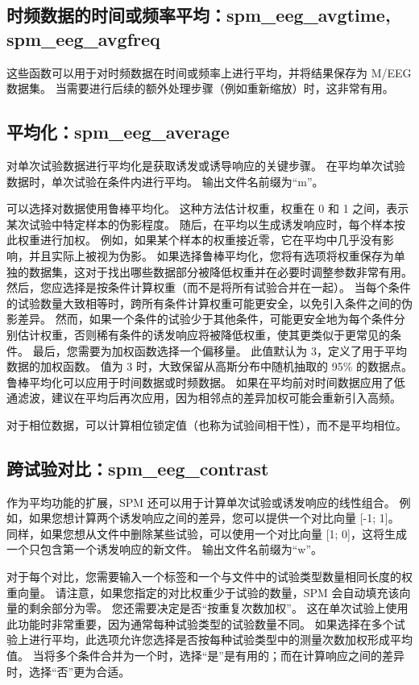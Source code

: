 \subsection{时频数据的时间或频率平均：spm\_eeg\_avgtime, spm\_eeg\_avgfreq}

这些函数可以用于对时频数据在时间或频率上进行平均，并将结果保存为 M/EEG 数据集。
当需要进行后续的额外处理步骤（例如重新缩放）时，这非常有用。


\subsection{平均化：spm\_eeg\_average}

对单次试验数据进行平均化是获取诱发或诱导响应的关键步骤。
在平均单次试验数据时，单次试验在条件内进行平均。
输出文件名前缀为“m”。

可以选择对数据使用鲁棒平均化。
这种方法估计权重，权重在 0 和 1 之间，表示某次试验中特定样本的伪影程度。
随后，在平均以生成诱发响应时，每个样本按此权重进行加权。
例如，如果某个样本的权重接近零，它在平均中几乎没有影响，并且实际上被视为伪影。
如果选择鲁棒平均化，您将有选项将权重保存为单独的数据集，这对于找出哪些数据部分被降低权重并在必要时调整参数非常有用。
然后，您应选择是按条件计算权重（而不是将所有试验合并在一起）。
当每个条件的试验数量大致相等时，跨所有条件计算权重可能更安全，以免引入条件之间的伪影差异。
然而，如果一个条件的试验少于其他条件，可能更安全地为每个条件分别估计权重，否则稀有条件的诱发响应将被降低权重，使其更类似于更常见的条件。
最后，您需要为加权函数选择一个偏移量。
此值默认为 3，定义了用于平均数据的加权函数。
值为 3 时，大致保留从高斯分布中随机抽取的 95\% 的数据点。
鲁棒平均化可以应用于时间数据或时频数据。
如果在平均前对时间数据应用了低通滤波，建议在平均后再次应用，因为相邻点的差异加权可能会重新引入高频。

对于相位数据，可以计算相位锁定值（也称为试验间相干性），而不是平均相位。


\subsection{跨试验对比：spm\_eeg\_contrast}

作为平均功能的扩展，SPM 还可以用于计算单次试验或诱发响应的线性组合。
例如，如果您想计算两个诱发响应之间的差异，您可以提供一个对比向量 [-1; 1]。
同样，如果您想从文件中删除某些试验，可以使用一个对比向量 [1; 0]，这将生成一个只包含第一个诱发响应的新文件。
输出文件名前缀为“w”。

对于每个对比，您需要输入一个标签和一个与文件中的试验类型数量相同长度的权重向量。
请注意，如果您指定的对比权重少于试验的数量，SPM 会自动填充该向量的剩余部分为零。
您还需要决定是否“按重复次数加权”。
这在单次试验上使用此功能时非常重要，因为通常每种试验类型的试验数量不同。
如果选择在多个试验上进行平均，此选项允许您选择是否按每种试验类型中的测量次数加权形成平均值。
当将多个条件合并为一个时，选择“是”是有用的；而在计算响应之间的差异时，选择“否”更为合适。


